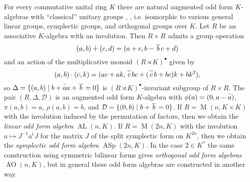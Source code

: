 \documentclass{article}
\theoremstyle{definition}
\DeclareMathOperator\mat{M}
\DeclareMathOperator\ofalin{AL}
\DeclareMathOperator\ofasymp{ASp}
\DeclareMathOperator\ofaorth{AO}
\newcommand{\inv}[1]{
    \!\;\overline{
        \!\!\:#1\vphantom !\!\!\:
    }\;\!
}
\begin{document}
For every commutative unital ring \(K\) there are natural augmented odd form \(K\)-algebras with ``classical'' unitary groups \cite[\S 2.3]{thesis}, \cite[\S 5]{classic-ofa}, i.e. isomorphic to various general linear groups, symplectic groups, and orthogonal groups over \(K\). Let \(R\) be an associative \(K\)-algebra with an involution. Then \(
    R \times R
\) admits a group operation \[
    (a, b) \dotplus (c, d) = (
        a + c,
        b - \inv{\,b\,} c + d
    )
\]
and an action of the multiplicative monoid \(
    (R \rtimes K)^\bullet
\) given by \[
    (a, b) \cdot (c, k) = (
        ac + ak,
        \inv{\,c\,} bc + (\inv{\,c\,}b + bc)k + bk^2
    ),
\]
so \(
    \Delta = \{
        (a, b) \mid b + \inv aa + \inv{\,b\,} = 0
    \}
\) is \(
    (R \rtimes K)^\bullet
\)-invariant subgroup of \(
    R \times R
\). The pair \((R, \Delta, \mathcal D)\) is an augmented odd form \(K\)-algebra with \(
    \phi(a) = (0, a - \inv a)
\), \(
    \pi(a, b) = a
\), \(
    \rho(a, b) = b
\), and \(
    \mathcal D = \{(0, b) \mid b + \inv{\,b\,} = 0\}
\). If \(
    R = \mat(n, K \times K)
\) with the involution induced by the permutation of factors, then we obtain the \textit{linear odd form algebra} \(
    \ofalin(n, K)
\). If \(
    R = \mat(2n, K)
\) with the involution \(
    a \mapsto J^{-1} a^{\mathrm t} J
\) for the matrix \(J\) of the split symplectic form on \(K^{2n}\), then we obtain the \textit{symplectic odd form algebra} \(
    \ofasymp(2n, K)
\). In the case \(
    2 \in K^*
\) the same construction using symmetric bilinear forms gives \textit{orthogonal odd form algebras} \(\ofaorth(n, K)\), but in general these odd form algebras are constructed in another way.
\end{document}
